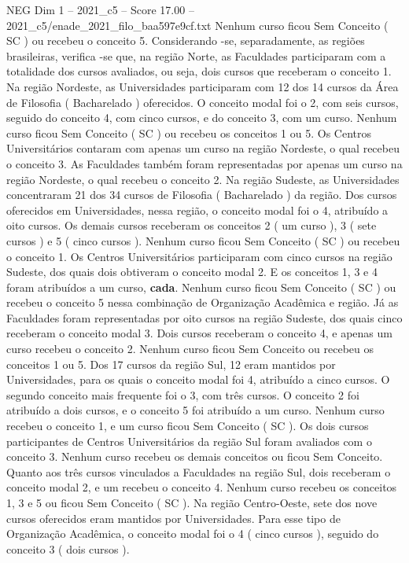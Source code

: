 \begin{textsample}{NEG Dim 1 – 2021\_c5 – Score 17.00 – 2021\_c5/enade\_2021\_filo\_baa597e9cf.txt}
Nenhum curso ficou Sem Conceito ( SC ) ou recebeu o conceito 5.
Considerando -se, separadamente, as regiões brasileiras, verifica -se que, na região Norte, as Faculdades participaram com a totalidade dos cursos avaliados, ou seja, dois cursos que receberam o conceito 1.
Na região Nordeste, as Universidades participaram com 12 dos 14 cursos da Área de Filosofia ( Bacharelado ) oferecidos.
O conceito modal foi o 2, com seis cursos, seguido do conceito 4, com cinco cursos, e do conceito 3, com um curso.
Nenhum curso ficou Sem Conceito ( SC ) ou recebeu os conceitos 1 ou 5.
Os Centros Universitários contaram com apenas um curso na região Nordeste, o qual recebeu o conceito 3.
As Faculdades também foram representadas por apenas um curso na região Nordeste, o qual recebeu o conceito 2.
Na região Sudeste, as Universidades concentraram 21 dos 34 cursos de Filosofia ( Bacharelado ) da região.
Dos cursos oferecidos em Universidades, nessa região, o conceito modal foi o 4, atribuído a oito cursos.
Os demais cursos receberam os conceitos 2 ( um curso ), 3 ( sete cursos ) e 5 ( cinco cursos ).
Nenhum curso ficou Sem Conceito ( SC ) ou recebeu o conceito 1.
Os Centros Universitários participaram com cinco cursos na região Sudeste, dos quais dois obtiveram o conceito modal 2.
E os conceitos 1, 3 e 4 foram atribuídos a um curso, \textbf{cada}.
Nenhum curso ficou Sem Conceito ( SC ) ou recebeu o conceito 5 nessa combinação de Organização Acadêmica e região.
Já as Faculdades foram representadas por oito cursos na região Sudeste, dos quais cinco receberam o conceito modal 3.
Dois cursos receberam o conceito 4, e apenas um curso recebeu o conceito 2.
Nenhum curso ficou Sem Conceito ou recebeu os conceitos 1 ou 5.
Dos 17 cursos da região Sul, 12 eram mantidos por Universidades, para os quais o conceito modal foi 4, atribuído a cinco cursos.
O segundo conceito mais frequente foi o 3, com três cursos.
O conceito 2 foi atribuído a dois cursos, e o conceito 5 foi atribuído a um curso.
Nenhum curso recebeu o conceito 1, e um curso ficou Sem Conceito ( SC ).
Os dois cursos participantes de Centros Universitários da região Sul foram avaliados com o conceito 3.
Nenhum curso recebeu os demais conceitos ou ficou Sem Conceito.
Quanto aos três cursos vinculados a Faculdades na região Sul, dois receberam o conceito modal 2, e um recebeu o conceito 4.
Nenhum curso recebeu os conceitos 1, 3 e 5 ou ficou Sem Conceito ( SC ).
Na região Centro-Oeste, sete dos nove cursos oferecidos eram mantidos por Universidades.
Para esse tipo de Organização Acadêmica, o conceito modal foi o 4 ( cinco cursos ), seguido do conceito 3 ( dois cursos ).

\end{textsample}
